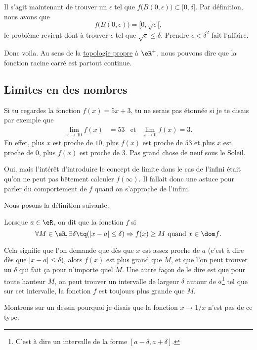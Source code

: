 Il s'agit maintenant de trouver un $\epsilon$ tel que $f\big( B(0,\epsilon) \big)\subset [0,\delta[$. Par définition, nous avons que
\[ 
  f\big( B(0,\epsilon) \big)=[0,\sqrt{\epsilon}[,
\]
le problème revient dont à trouver $\epsilon$ tel que $\sqrt{\epsilon}\leq\delta$. Prendre $\epsilon<\delta^2$ fait l'affaire.


Donc voila. Au sens de la \href{http://fr.wikipedia.org/wiki/Topologie_induite}{topologie propre} à $\eR^+$, nous pouvons dire que la fonction racine carré est partout continue.
\subsection{Limites en des nombres}

Si tu regardes la fonction $f(x)=5x+3$, tu ne serais pas étonnée si je te disais par exemple que 
\begin{align}
\lim_{x\to 10}f(x)&=53&\text{et}&\lim_{x\to 0}f(x)=3.
\end{align}
En effet, plus $x$ est proche de $10$, plus $f(x)$ est proche de $53$ et plus $x$ est proche de $0$, plus $f(x)$ est proche de $3$. Pas grand chose de neuf sous le Soleil.

Oui, mais l'intérêt d'introduire le concept de limite dans le cas de l'infini était qu'on ne peut pas bêtement calculer $f(\infty)$. Il fallait donc une astuce pour parler du comportement de $f$ quand on s'approche de l'infini.

Nous posons la définition suivante.
\begin{definition}      \label{DefInfNombre}
Lorsque $a\in\eR$, on dit que la fonction $f$  si
\[ 
  \forall M\in\eR,\exists \delta\tq (| x-a |\leq \delta )\Rightarrow f(x)\geq M\text{ quand $x\in\dom f$}.
\]
\end{definition}
Cela signifie que l'on demande que dès que $x$ est assez proche de $a$ (c'est à dire dès que $| x-a |\leq\delta$), alors $f(x)$ est plus grand que $M$, et que l'on peut trouver un $\delta$ qui fait ça pour n'importe quel $M$. Une autre façon de le dire est que pour toute hauteur $M$, on peut trouver un intervalle de largeur $\delta$ autour de $a$\footnote{C'est à dire un intervalle de la forme $[a-\delta,a+\delta]$.} tel que sur cet intervalle, la fonction $f$ est toujours plus grande que $M$.

Montrons sur un dessin pourquoi je disais que la fonction $x\to 1/x$ n'est pas de ce type.


